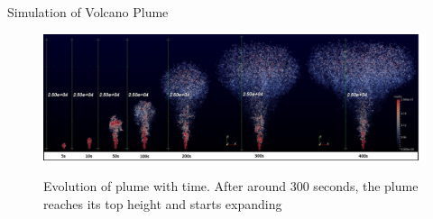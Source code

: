 \documentclass[final]{beamer}
\newlength{\onecolwid}
\newlength{\twocolwid}
\begin{document}
\begin{frame}[t]
\begin{columns}[t]
\begin{column}{\twocolwid}
\begin{columns}[t,totalwidth=\twocolwid]
\begin{column}{\onecolwid}




\end{column} %

\end{columns} \vspace{-1.0in}

\begin{block}{Simulation of Volcano Plume}

\begin{figure}
\centering
{\includegraphics[scale=0.90]{plume_grow_up}}
\caption{Evolution of plume with time. After around 300 seconds, the plume reaches its top height and starts expanding}
\end{figure}

\end{block}\vspace{-1.8in}

\begin{columns}[t,totalwidth=\twocolwid] \vspace{-1.5in}%

\begin{column}{\onecolwid} %


\end{column}
\end{columns}
\end{column}
\end{columns}
\end{frame}
\end{document}
